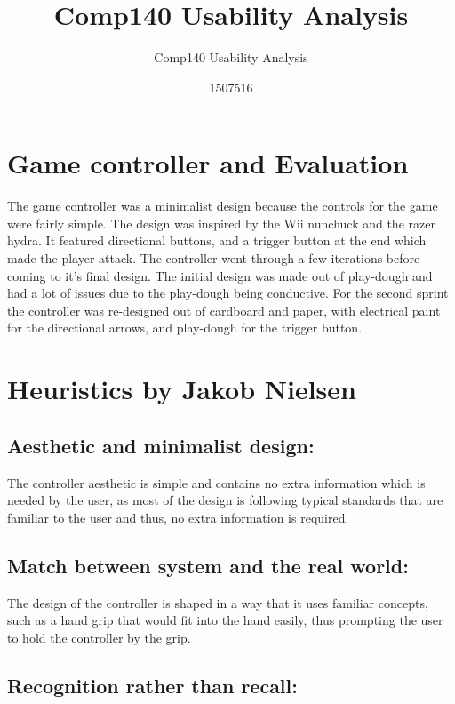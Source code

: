 \documentclass{scrartcl}
\title{Comp140 Usability Analysis}
\subtitle{Comp140 Usability Analysis}
\author{1507516}
\begin{document}
\maketitle

\abstract{}

\section{Game controller and Evaluation}

The game controller was a minimalist design because the controls for the game were fairly simple. The design was inspired by the Wii nunchuck and the razer hydra. It featured directional buttons, and a trigger button at the end which made the player attack. The controller went through a few iterations before coming to it's final design. The initial design was made out of play-dough and had a lot of issues due to the play-dough being conductive. For the second sprint the controller was re-designed out of cardboard and paper, with electrical paint for the directional arrows, and play-dough for the trigger button.


\section{Heuristics by Jakob Nielsen\cite{nielsen1990heuristic}}
\subsection{Aesthetic and minimalist design:}

The controller aesthetic is simple and contains no extra information which is needed by the user, as most of the design is following typical standards that are familiar to the user and thus, no extra information is required. 

\subsection{Match between system and the real world:}

The design of the controller is shaped in a way that it uses familiar concepts, such as a hand grip that would fit into the hand easily, thus prompting the user to hold the controller by the grip.

\subsection{Recognition rather than recall:}
\end{document}
